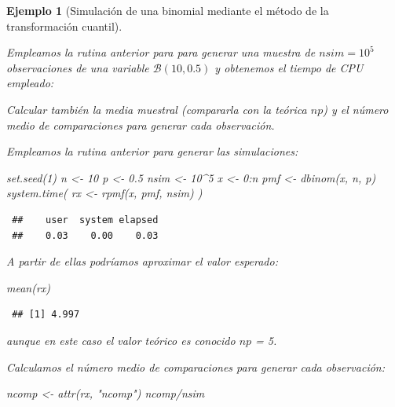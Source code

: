 \documentclass[
  10pt,
]{book}
\newenvironment{Shaded}{\begin{snugshade}}{\end{snugshade}}
\newcommand{\DecValTok}[1]{\textcolor[rgb]{0.00,0.00,0.81}{#1}}
\newcommand{\FloatTok}[1]{\textcolor[rgb]{0.00,0.00,0.81}{#1}}
\newcommand{\FunctionTok}[1]{\textcolor[rgb]{0.00,0.00,0.00}{#1}}
\newcommand{\NormalTok}[1]{#1}
\newcommand{\OtherTok}[1]{\textcolor[rgb]{0.56,0.35,0.01}{#1}}
\newcommand{\SpecialCharTok}[1]{\textcolor[rgb]{0.00,0.00,0.00}{#1}}
\newcommand{\StringTok}[1]{\textcolor[rgb]{0.31,0.60,0.02}{#1}}
\theoremstyle{break}
\newtheorem{example}{Ejemplo}[chapter]
\theoremstyle{nonumberplain}
\begin{document}
\begin{example}[Simulación de una binomial mediante el método de la transformación cuantil]
\protect\hypertarget{exm:binom-cuant}{}\label{exm:binom-cuant}

Empleamos la rutina anterior para para generar una muestra de \(nsim=10^{5}\) observaciones de una variable \(\mathcal{B}(10,0.5)\) y obtenemos el tiempo de CPU empleado:

Calcular también la
media muestral (compararla con la teórica \(np\)) y el número
medio de comparaciones para generar cada observación.

Empleamos la rutina anterior para generar las simulaciones:

\begin{Shaded}
\begin{Highlighting}[]
\FunctionTok{set.seed}\NormalTok{(}\DecValTok{1}\NormalTok{)}
\NormalTok{n }\OtherTok{\textless{}{-}} \DecValTok{10}
\NormalTok{p }\OtherTok{\textless{}{-}} \FloatTok{0.5}
\NormalTok{nsim }\OtherTok{\textless{}{-}} \DecValTok{10}\SpecialCharTok{\^{}}\DecValTok{5}
\NormalTok{x }\OtherTok{\textless{}{-}} \DecValTok{0}\SpecialCharTok{:}\NormalTok{n}
\NormalTok{pmf }\OtherTok{\textless{}{-}} \FunctionTok{dbinom}\NormalTok{(x, n, p)}
\FunctionTok{system.time}\NormalTok{( rx }\OtherTok{\textless{}{-}} \FunctionTok{rpmf}\NormalTok{(x, pmf, nsim) )}
\end{Highlighting}
\end{Shaded}

\begin{verbatim}
 ##    user  system elapsed 
 ##    0.03    0.00    0.03
\end{verbatim}

A partir de ellas podríamos aproximar el valor esperado:

\begin{Shaded}
\begin{Highlighting}[]
\FunctionTok{mean}\NormalTok{(rx)}
\end{Highlighting}
\end{Shaded}

\begin{verbatim}
 ## [1] 4.997
\end{verbatim}

aunque en este caso el valor teórico es conocido \(np\) = 5.

Calculamos el número medio de comparaciones para generar cada observación:

\begin{Shaded}
\begin{Highlighting}[]
\NormalTok{ncomp }\OtherTok{\textless{}{-}} \FunctionTok{attr}\NormalTok{(rx, }\StringTok{"ncomp"}\NormalTok{)}
\NormalTok{ncomp}\SpecialCharTok{/}\NormalTok{nsim}
\end{Highlighting}
\end{Shaded}


\end{example}
\end{document}

